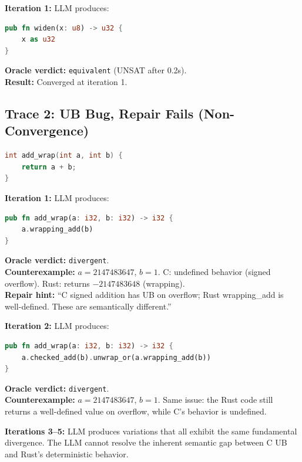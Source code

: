 \documentclass[11pt]{article}
\begin{document}
\noindent\textbf{Iteration 1:} LLM produces:
\begin{lstlisting}[language=Rust,caption={Rust translation (correct).}]
pub fn widen(x: u8) -> u32 {
    x as u32
}
\end{lstlisting}

\noindent\textbf{Oracle verdict:} \texttt{equivalent} (UNSAT after 0.2s).\\
\textbf{Result:} Converged at iteration 1.

\subsection{Trace 2: UB Bug, Repair Fails (Non-Convergence)}

\begin{lstlisting}[language=C,caption={C source: \texttt{add\_wrapping}.}]
int add_wrap(int a, int b) {
    return a + b;
}
\end{lstlisting}

\noindent\textbf{Iteration 1:} LLM produces:
\begin{lstlisting}[language=Rust,caption={Rust translation attempt 1.}]
pub fn add_wrap(a: i32, b: i32) -> i32 {
    a.wrapping_add(b)
}
\end{lstlisting}

\noindent\textbf{Oracle verdict:} \texttt{divergent}.\\
\textbf{Counterexample:} $a = 2147483647$, $b = 1$.
C: undefined behavior (signed overflow).
Rust: returns $-2147483648$ (wrapping).\\
\textbf{Repair hint:} ``C signed addition has UB on overflow; Rust
wrapping\_add is well-defined.  These are semantically different.''

\noindent\textbf{Iteration 2:} LLM produces:
\begin{lstlisting}[language=Rust,caption={Rust translation attempt 2 (still wrong).}]
pub fn add_wrap(a: i32, b: i32) -> i32 {
    a.checked_add(b).unwrap_or(a.wrapping_add(b))
}
\end{lstlisting}

\noindent\textbf{Oracle verdict:} \texttt{divergent}.\\
\textbf{Counterexample:} $a = 2147483647$, $b = 1$.
Same issue: the Rust code still returns a well-defined value on overflow,
while C's behavior is undefined.

\noindent\textbf{Iterations 3--5:} LLM produces variations that all exhibit
the same fundamental divergence.  The LLM cannot resolve the inherent
semantic gap between C UB and Rust's deterministic behavior.
\end{document}
